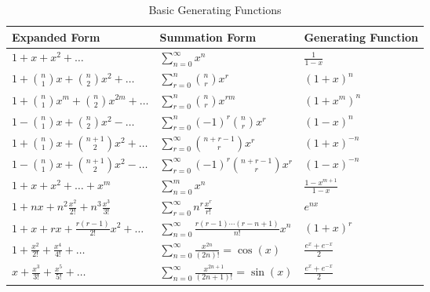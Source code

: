 \begin{table}[h]
    \renewcommand{\arraystretch}{1.5}
    \centering
    \begin{tabularx}{\textwidth}{Xll}
        \toprule
        \textbf{Expanded Form}                                     & \textbf{Summation Form}                               & \textbf{Generating Function}         \\
        \midrule
        \mbox{$1+x+x^2+\dots$}                                     & \mbox{$\sum_{n=0}^{\infty} x^n$}                                & \mbox{$\frac{1}{1-x}$}         \\
        \mbox{$1 + \binom{n}{1}x + \binom{n}{2}x^2 + \dots $}      & \mbox{$\sum_{r=0}^{n} \binom{n}{r} x^r$}                        & \mbox{$(1+x)^n$}               \\
        \mbox{$1 + \binom{n}{1}x^m + \binom{n}{2}x^{2m} + \dots $} & \mbox{$\sum_{r=0}^{n} \binom{n}{r} x^{rm}$}                     & \mbox{$(1+x^m)^{n}$}           \\
        \mbox{$1 - \binom{n}{1}x + \binom{n}{2}x^2 - \dots $}      & \mbox{$\sum_{r=0}^{n} (-1)^r \binom{n}{r} x^r$}                 & \mbox{$(1-x)^n$}               \\
        \mbox{$1 + \binom{n}{1}x + \binom{n+1}{2}x^2 + \dots$}     & \mbox{$\sum_{r=0}^{\infty} \binom{n+r-1}{r} x^r$}               & \mbox{$(1+x)^{-n}$}            \\
        \mbox{$1 - \binom{n}{1}x + \binom{n+1}{2}x^2 - \dots$}     & \mbox{$\sum_{r=0}^{\infty} (-1)^r \binom{n+r-1}{r} x^r$}        & \mbox{$(1-x)^{-n}$}            \\
        \mbox{$1+x+x^2+\dots+x^m$}                                 & \mbox{$\sum_{n=0}^{m} x^n$}                                     & \mbox{$\frac{1-x^{m+1}}{1-x}$} \\
        \mbox{$1+nx+n^2\frac{x^2}{2!}+n^3\frac{x^3}{3!}$}          & \mbox{$\sum_{r=0}^{\infty} n^r \frac{x^r}{r!}$}                 & \mbox{$e^{nx}$}                \\
        \mbox{$1+x+rx+\frac{r(r-1)}{2!}x^2+\dots$}                 & \mbox{$\sum_{n=0}^{\infty} \frac{r(r-1)\cdots(r-n+1)}{n!} x^n$} & \mbox{$(1+x)^r$}               \\
        \mbox{$1+\frac{x^2}{2!}+\frac{x^4}{4!}+\dots$}             & \mbox{$\sum_{n=0}^{\infty} \frac{x^{2n}}{(2n)!}=\cos(x)$}       & \mbox{$\frac{e^x+e^{-x}}{2}$}  \\
        \mbox{$x+\frac{x^3}{3!}+\frac{x^5}{5!}+\dots$}             & \mbox{$\sum_{n=0}^{\infty} \frac{x^{2n+1}}{(2n+1)!}=\sin(x)$}   & \mbox{$\frac{e^x+e^{-x}}{2}$}  \\
        \bottomrule
    \end{tabularx}
    \caption{Basic Generating Functions}
    \label{tab:basic_Permutations}
\end{table}

